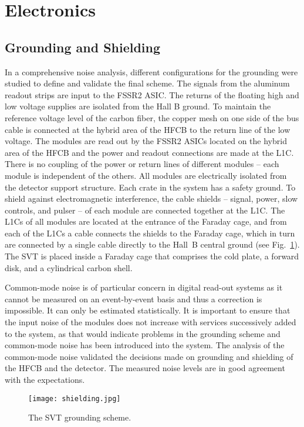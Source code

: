 \section{Electronics}

\subsection{Grounding and Shielding}

In a comprehensive noise analysis, different configurations for the grounding were studied to define and validate
the final scheme. The signals from the aluminum readout strips are input to the FSSR2 ASIC. The returns of the
floating high and low voltage supplies are isolated from the Hall B ground. To maintain the reference voltage level
of the carbon fiber, the copper mesh on one side of the bus cable is connected at the hybrid area of the HFCB to
the return line of the low voltage. The modules are read out by the FSSR2 ASICs located on the hybrid area of the
HFCB and the power and readout connections are made at the L1C. There is no coupling of the power or return lines
of different modules -- each module is independent of the others. All modules are electrically isolated from the
detector support structure. Each crate in the system has a safety ground. To shield against electromagnetic
interference, the cable shields -- signal, power, slow controls, and pulser -- of each module are connected together at
the L1C. The L1Cs of all modules are located at the entrance of the Faraday cage, and from each of the L1Cs a cable
connects the shields to the Faraday cage, which in turn are connected by a single cable directly to the Hall~B central
ground (see Fig.~\ref{fig:shielding}). The SVT is placed inside a Faraday cage that comprises the cold plate, a
forward disk, and a cylindrical carbon shell. 

Common-mode noise is of particular concern in digital read-out systems as it cannot be measured on an event-by-event
basis and thus a correction is impossible. It can only be estimated statistically. It is important to ensure that the
input noise of the modules does not increase with services successively added to the system, as that would indicate
problems in the grounding scheme and common-mode noise has been introduced into the system. The analysis of the
common-mode noise validated the decisions made on grounding and shielding of the HFCB and the detector. The
measured noise levels are in good agreement with the expectations.

\begin{figure}[hbt] 
\centering 
\texttt{[image: shielding.jpg]}
\caption{The SVT grounding scheme.}
\label{fig:shielding}
\end{figure}

